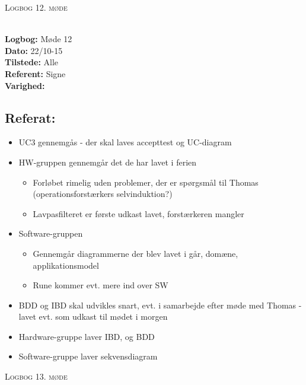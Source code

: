 \documentclass[a4paper,11pt,oneside]{memoir}
\begin{document}
\newpage


\begin{center} 
\huge{\textsc{Logbog 12. møde}}
\end{center}

\textbf{ }
\\
\textbf{Logbog:} Møde 12
\\
\textbf{Dato:} 22/10-15
\\
\textbf{Tilstede:} Alle
\\
\textbf{Referent:} Signe
\\
\textbf{Varighed:} 
\\

\subsection{Referat:}
\begin{itemize}
\item UC3 gennemgås - der skal laves accepttest og UC-diagram
\item HW-gruppen gennemgår det de har lavet i ferien 
\begin{itemize}
\item Forløbet rimelig uden problemer, der er spørgsmål til Thomas (operationsforstærkers selvinduktion?)
\item Lavpasfilteret er første udkast lavet, forstærkeren mangler 
\end{itemize}
\item Software-gruppen
\begin{itemize}
\item Gennemgår diagrammerne der blev lavet i går, domæne, applikationsmodel
\item Rune kommer evt. mere ind over SW 
\end{itemize}
\item BDD og IBD skal udvikles snart, evt. i samarbejde efter møde med Thomas - lavet evt. som udkast til mødet i morgen
\item Hardware-gruppe laver IBD, og BDD
\item Software-gruppe laver sekvensdiagram
\end{itemize}

\newpage


\begin{center} 
\huge{\textsc{Logbog 13. møde}}
\end{center}
\end{document}
